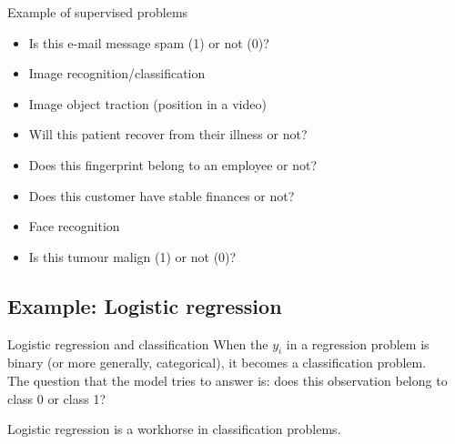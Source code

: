\documentclass[10pt,handout]{beamer}
\begin{document}
\begin{frame}{Example of supervised problems}


\begin{itemize}
\item Is this e-mail message spam (1) or not (0)?\pause
\item Image recognition/classification\pause
\item Image object traction (position in a video)\pause
\item Will this patient recover from their illness or not?\pause
\item Does this fingerprint belong to an employee or not?\pause
\item Does this customer have stable finances or not?\pause
\item Face recognition\pause
\item Is this tumour malign (1) or not (0)?\pause
\end{itemize}

\end{frame}


\subsection{Example: Logistic regression}

\begin{frame}{Logistic regression and classification}
When the $y_i$ in a regression problem is binary (or more generally, categorical), it becomes a {\color{uured}classification problem}.\\[3mm]\pause
The question that the model tries to answer is: does this observation belong to class 0 or class 1?\\[3mm]\pause

Logistic regression is a workhorse in classification problems.


\end{frame}
\end{document}
